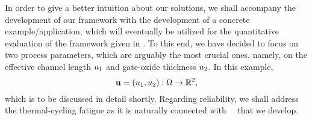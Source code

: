 In order to give a better intuition about our solutions, we shall accompany the development of our framework with the development of a concrete example/application, which will eventually be utilized for the quantitative evaluation of the framework given in .
To this end, we have decided to focus on two process parameters, which are arguably the most crucial ones, namely, on the effective channel length $u_1$ and gate-oxide thickness $u_2$.
In this example,
\begin{equation} \elab{application-uncertain-parameters}
  \vu = (\Leff, \Tox): \outcomes \to \real^2,
\end{equation}
which is to be discussed in detail shortly.
Regarding reliability, we shall address the thermal-cycling fatigue as it is naturally connected with \DSS\ \ta\ that we develop.
